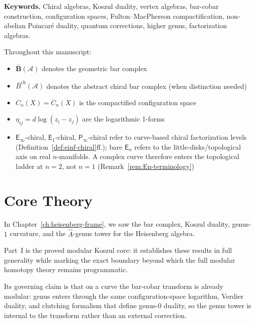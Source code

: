 \documentclass[11pt]{memoir}
\newcommand{\Eone}{\mathsf{E}_1}
\newcommand{\En}{\mathsf{E}_n}
\newcommand{\Einf}{\mathsf{E}_{\infty}}
\newcommand{\Pinf}{\mathsf{P}_{\infty}}
\newcommand{\barBgeom}{\bar{\mathbf{B}}}
\newcommand{\barBch}{\bar{B}^{\text{ch}}}       %
\newcommand{\ConfigSpace}[1]{\overline{C}_{#1}(X)}  %
\newcommand{\LogForm}[2]{\eta_{#1#2}}           %
\begin{document}
\medskip
\noindent
\textbf{Keywords.}
Chiral algebras, Koszul duality, vertex algebras, bar-cobar construction,
configuration spaces, Fulton--MacPherson compactification, non-abelian
Poincar\'e duality, quantum corrections, higher genus, factorization algebras.

\hfuzz=4pt
\tableofcontents
\hfuzz=2.5pt

\begin{remark}
Throughout this manuscript:
\begin{itemize}
\item $\barBgeom(\mathcal{A})$ denotes the geometric bar complex
\item $\barBch(\mathcal{A})$ denotes the abstract chiral bar complex (when distinction needed)
\item $\ConfigSpace{n} = \overline{C}_n(X)$ is the compactified configuration space
\item $\LogForm{i}{j} = d\log(z_i - z_j)$ are the logarithmic 1-forms
\item $\Einf$-chiral, $\Eone$-chiral, $\Pinf$-chiral refer to
  curve-based chiral factorization levels
  (Definition~\ref{def:einf-chiral}ff.); bare $\En$ refers to the
  little-disks/topological axis on real $n$-manifolds.  A complex
  curve therefore enters the topological ladder at $n = 2$, not
  $n = 1$ (Remark~\ref{rem:En-terminology})
\end{itemize}
\end{remark}





\part{Core Theory}

\noindent
In Chapter~\ref{ch:heisenberg-frame}, we saw the bar complex,
Koszul duality, genus-$1$ curvature, and the $\hat{A}$-genus tower
for the Heisenberg algebra.

Part~I is the proved modular Koszul core:
it establishes these results in full generality while marking the exact
boundary beyond which the full modular homotopy theory remains
programmatic.

Its governing claim is that on a curve the bar-cobar transform is
already modular: genus enters through the same configuration-space
logarithm, Verdier duality, and clutching formalism that define
genus-$0$ duality, so the genus tower is internal to the transform
rather than an external correction.
\end{document}
